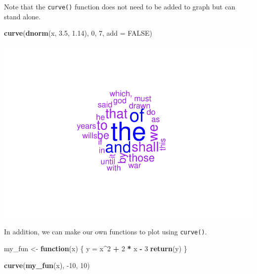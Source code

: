 \documentclass[
]{book}
\newenvironment{Shaded}{\begin{snugshade}}{\end{snugshade}}
\newcommand{\ControlFlowTok}[1]{\textcolor[rgb]{0.13,0.29,0.53}{\textbf{#1}}}
\newcommand{\DataTypeTok}[1]{\textcolor[rgb]{0.13,0.29,0.53}{#1}}
\newcommand{\DecValTok}[1]{\textcolor[rgb]{0.00,0.00,0.81}{#1}}
\newcommand{\FloatTok}[1]{\textcolor[rgb]{0.00,0.00,0.81}{#1}}
\newcommand{\KeywordTok}[1]{\textcolor[rgb]{0.13,0.29,0.53}{\textbf{#1}}}
\newcommand{\NormalTok}[1]{#1}
\newcommand{\OperatorTok}[1]{\textcolor[rgb]{0.81,0.36,0.00}{\textbf{#1}}}
\newcommand{\OtherTok}[1]{\textcolor[rgb]{0.56,0.35,0.01}{#1}}
\newcommand{\StringTok}[1]{\textcolor[rgb]{0.31,0.60,0.02}{#1}}
\begin{document}
Note that the \texttt{curve()} function does not need to be added to graph but can stand alone.

\begin{Shaded}
\begin{Highlighting}[]
\KeywordTok{curve}\NormalTok{(}\KeywordTok{dnorm}\NormalTok{(x, }\FloatTok{3.5}\NormalTok{, }\FloatTok{1.14}\NormalTok{), }\DecValTok{0}\NormalTok{, }\DecValTok{7}\NormalTok{, }\DataTypeTok{add =} \OtherTok{FALSE}\NormalTok{)}
\end{Highlighting}
\end{Shaded}

\includegraphics{_main_files/figure-latex/unnamed-chunk-227-1.pdf}

In addition, we can make our own functions to plot using \texttt{curve()}.

\begin{Shaded}
\begin{Highlighting}[]
\NormalTok{my_fun <-}\StringTok{ }\ControlFlowTok{function}\NormalTok{(x) \{}
\NormalTok{    y =}\StringTok{ }\NormalTok{x}\OperatorTok{^}\DecValTok{2} \OperatorTok{+}\StringTok{ }\DecValTok{2} \OperatorTok{*}\StringTok{ }\NormalTok{x }\OperatorTok{-}\StringTok{ }\DecValTok{3}
    \KeywordTok{return}\NormalTok{(y)}
\NormalTok{\}}

\KeywordTok{curve}\NormalTok{(}\KeywordTok{my_fun}\NormalTok{(x), }\DecValTok{-10}\NormalTok{, }\DecValTok{10}\NormalTok{)}
\end{Highlighting}
\end{Shaded}
\end{document}
